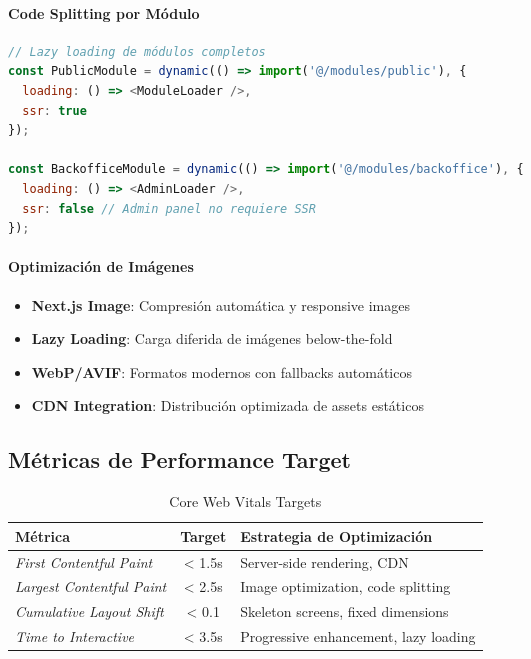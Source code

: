 \documentclass[12pt,a4paper]{article}
\begin{document}
\paragraph{Code Splitting por Módulo}
\begin{lstlisting}[language=javascript, caption=Dynamic Imports por Módulo]
// Lazy loading de módulos completos
const PublicModule = dynamic(() => import('@/modules/public'), {
  loading: () => <ModuleLoader />,
  ssr: true
});

const BackofficeModule = dynamic(() => import('@/modules/backoffice'), {
  loading: () => <AdminLoader />,
  ssr: false // Admin panel no requiere SSR
});
\end{lstlisting}

\paragraph{Optimización de Imágenes}
\begin{itemize}
    \item \textbf{Next.js Image}: Compresión automática y responsive images
    \item \textbf{Lazy Loading}: Carga diferida de imágenes below-the-fold
    \item \textbf{WebP/AVIF}: Formatos modernos con fallbacks automáticos
    \item \textbf{CDN Integration}: Distribución optimizada de assets estáticos
\end{itemize}

\subsection{Métricas de Performance Target}

\begin{table}[h!]
\centering
\begin{tabularx}{\textwidth}{|l|c|X|}
\hline
\textbf{Métrica} & \textbf{Target} & \textbf{Estrategia de Optimización} \\
\hline
\textit{First Contentful Paint} & < 1.5s & Server-side rendering, CDN \\
\hline
\textit{Largest Contentful Paint} & < 2.5s & Image optimization, code splitting \\
\hline
\textit{Cumulative Layout Shift} & < 0.1 & Skeleton screens, fixed dimensions \\
\hline
\textit{Time to Interactive} & < 3.5s & Progressive enhancement, lazy loading \\
\hline
\end{tabularx}
\caption{Core Web Vitals Targets}
\end{table}
\end{document}
